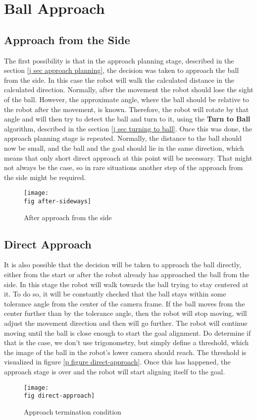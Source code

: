 \section{Ball Approach}
\label{p sec approach}

\subsection*{Approach from the Side}

The first possibility is that in the approach planning stage, described in the
section \ref{j sec approach planning}, the decision was taken to approach the
ball from the side. In this case the robot will walk the calculated distance in
the calculated direction. Normally, after the movement the robot should lose
the sight of the ball. However, the approximate angle, where the ball should be
relative to the robot after the movement, is known. Therefore, the robot will
rotate by that angle and will then try to detect the ball and turn to it, using
the \textbf{Turn to Ball} algorithm, described in the section \ref {j sec
  turning to ball}. Once this was done, the approach planning stage is
repeated. Normally, the distance to the ball should now be small, and the ball
and the goal should lie in the same direction, which means that only short
direct approach at this point will be necessary. That might not always be the
case, so in rare situations another step of the approach from the side might be
required.

\begin{figure}[ht]
  \texttt{[image: \\fig after-sideways]}
  \caption{After approach from the side}
  \label{p figure after-sideways}
\end{figure}

\subsection*{Direct Approach}

It is also possible that the decision will be taken to approach the ball
directly, either from the start or after the robot already has approached the
ball from the side. In this stage the robot will walk towards the ball trying
to stay centered at it. To do so, it will be constantly checked that the ball
stays within some tolerance angle from the center of the camera frame. If the
ball moves from the center further than by the tolerance angle, then the robot
will stop moving, will adjust the movement direction and then will go further.
The robot will continue moving until the ball is close enough to start the goal
alignment. Do determine if that is the case, we don't use trigonometry, but
simply define a threshold, which the image of the ball in the robot's lower
camera should reach. The threshold is visualized in figure \ref{p figure
  direct-approach}. Once this has happened, the approach stage is over and the
robot will start aligning itself to the goal.

\begin{figure}[ht]
  \texttt{[image: \\fig direct-approach]}
  \caption{Approach termination condition}
  \label{p figure direct-approach}
\end{figure}
